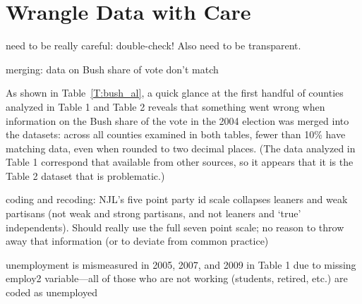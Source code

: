 

\section{Wrangle Data with Care}

need to be really careful: double-check!  Also need to be transparent.

merging: data on Bush share of vote don't match

As shown in Table~\ref{T:bush_al}, a quick glance at the first handful of counties analyzed in Table 1 and Table 2 \citep{Newman2015} reveals that something went wrong when information on the Bush share of the vote in the 2004 election was merged into the datasets: across all counties examined in both tables, fewer than 10\% have matching data, even when rounded to two decimal places.  (The data analyzed in Table 1 correspond that available from other sources, so it appears that it is the Table 2 dataset that is problematic.)



coding and recoding: NJL's five point party id scale collapses leaners and weak partisans (not weak and strong partisans, and not leaners and `true' independents).  Should really use the full seven point scale; no reason to throw away that information (or to deviate from common practice)

unemployment is mismeasured in 2005, 2007, and 2009 in Table 1 due to missing employ2 variable---all of those who are not working (students, retired, etc.) are coded as unemployed
